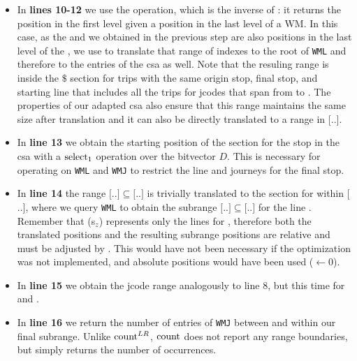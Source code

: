 \begin{itemize}
        \item In \textbf{lines 10-12} we use the  operation, which is the inverse of : it returns the position in the first level given a position in the last level of a WM. In this case, as the  and  we obtained in the previous step are also positions in the last level of the , we use  to translate that range of indexes to the root of \texttt{WML} and therefore to the entries of the \gls{csa} as well. Note that the resuling range is inside the $\$$ section for trips with the same origin stop, final stop, and starting line that includes all the trips for jcodes that span from  to . The properties of our adapted \gls{csa} also ensure that this range maintains the same size after translation and it can also be directly translated to a range in $[$$..$$]$.
        
        \item In \textbf{line 13} we obtain the starting position of the section for the stop  in the \gls{csa} with a $\operatorname{select}_1$ operation over the bitvector $D$. This is necessary for operating on \texttt{WML} and \texttt{WMJ} to restrict the line and journeys for the final stop.
        
        \item In \textbf{line 14} the range $[$$..$$] \subseteq [$$..$$]$ is trivially translated to the section for
         within $[$$..$$]$, where we query \texttt{WML} to obtain the subrange $[$$..$$] \subseteq [$$..$$]$ for the line . Remember that (s$_z$) represents only the lines for , therefore both the translated positions and the resulting subrange positions are relative and must be adjusted by . This would have not been necessary if the optimization was not implemented, and absolute positions would have been used ($\leftarrow 0$).
        
        \item In \textbf{line 15} we obtain the jcode range analogously to line 8, but this time for  and .
        
        \item In \textbf{line 16} we return the number of entries of \texttt{WMJ} between  and  within our final subrange. Unlike $\operatorname{count}^{LR}$, $\operatorname{count}$ does not report any range boundaries, but simply returns the number of occurrences.
    \end{itemize}
    

